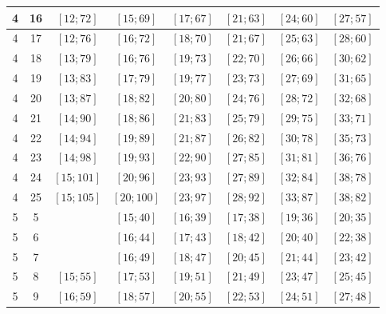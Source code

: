 \documentclass[a4paper,12pt]{article}
\begin{document}
\begin{center}
{\begin{longtable}[H]{|c|c|c|c|c|c|c|c|}
4 &  16 &  $\left[ 12; 72\right]$ &  $\left[ 15; 69\right]$ &  $\left[ 17; 67\right]$ &  $\left[ 21; 63\right]$ &  $\left[ 24; 60\right]$ &  $\left[ 27; 57\right]$ \tabularnewline \hline
4 &  17 &  $\left[ 12; 76\right]$ &  $\left[ 16; 72\right]$ &  $\left[ 18; 70\right]$ &  $\left[ 21; 67\right]$ &  $\left[ 25; 63\right]$ &  $\left[ 28; 60\right]$ \tabularnewline \hline
4 &  18 &  $\left[ 13; 79\right]$ &  $\left[ 16; 76\right]$ &  $\left[ 19; 73\right]$ &  $\left[ 22; 70\right]$ &  $\left[ 26; 66\right]$ &  $\left[ 30; 62\right]$ \tabularnewline \hline
4 &  19 &  $\left[ 13; 83\right]$ &  $\left[ 17; 79\right]$ &  $\left[ 19; 77\right]$ &  $\left[ 23; 73\right]$ &  $\left[ 27; 69\right]$ &  $\left[ 31; 65\right]$ \tabularnewline \hline
4 &  20 &  $\left[ 13; 87\right]$ &  $\left[ 18; 82\right]$ &  $\left[ 20; 80\right]$ &  $\left[ 24; 76\right]$ &  $\left[ 28; 72\right]$ &  $\left[ 32; 68\right]$ \tabularnewline \hline
4 &  21 &  $\left[ 14; 90\right]$ &  $\left[ 18; 86\right]$ &  $\left[ 21; 83\right]$ &  $\left[ 25; 79\right]$ &  $\left[ 29; 75\right]$ &  $\left[ 33; 71\right]$ \tabularnewline \hline
4 &  22 &  $\left[ 14; 94\right]$ &  $\left[ 19; 89\right]$ &  $\left[ 21; 87\right]$ &  $\left[ 26; 82\right]$ &  $\left[ 30; 78\right]$ &  $\left[ 35; 73\right]$ \tabularnewline \hline
4 &  23 &  $\left[ 14; 98\right]$ &  $\left[ 19; 93\right]$ &  $\left[ 22; 90\right]$ &  $\left[ 27; 85\right]$ &  $\left[ 31; 81\right]$ &  $\left[ 36; 76\right]$ \tabularnewline \hline
4 &  24 &  $\left[ 15; 101\right]$ &  $\left[ 20; 96\right]$ &  $\left[ 23; 93\right]$ &  $\left[ 27; 89\right]$ &  $\left[ 32; 84\right]$ &  $\left[ 38; 78\right]$ \tabularnewline \hline
4 &  25 &  $\left[ 15; 105\right]$ &  $\left[ 20; 100\right]$ &  $\left[ 23; 97\right]$ &  $\left[ 28; 92\right]$ &  $\left[ 33; 87\right]$ &  $\left[ 38; 82\right]$ \tabularnewline \hline
5 &  5 &   &  $\left[ 15; 40\right]$ &  $\left[ 16; 39\right]$ &  $\left[ 17; 38\right]$ &  $\left[ 19; 36\right]$ &  $\left[ 20; 35\right]$ \tabularnewline \hline
5 &  6 &   &  $\left[ 16; 44\right]$ &  $\left[ 17; 43\right]$ &  $\left[ 18; 42\right]$ &  $\left[ 20; 40\right]$ &  $\left[ 22; 38\right]$ \tabularnewline \hline
5 &  7 &   &  $\left[ 16; 49\right]$ &  $\left[ 18; 47\right]$ &  $\left[ 20; 45\right]$ &  $\left[ 21; 44\right]$ &  $\left[ 23; 42\right]$ \tabularnewline \hline
5 &  8 &  $\left[ 15; 55\right]$ &  $\left[ 17; 53\right]$ &  $\left[ 19; 51\right]$ &  $\left[ 21; 49\right]$ &  $\left[ 23; 47\right]$ &  $\left[ 25; 45\right]$ \tabularnewline \hline
5 &  9 &  $\left[ 16; 59\right]$ &  $\left[ 18; 57\right]$ &  $\left[ 20; 55\right]$ &  $\left[ 22; 53\right]$ &  $\left[ 24; 51\right]$ &  $\left[ 27; 48\right]$ \tabularnewline \hline

\end{longtable}}
\end{center}
\end{document}
